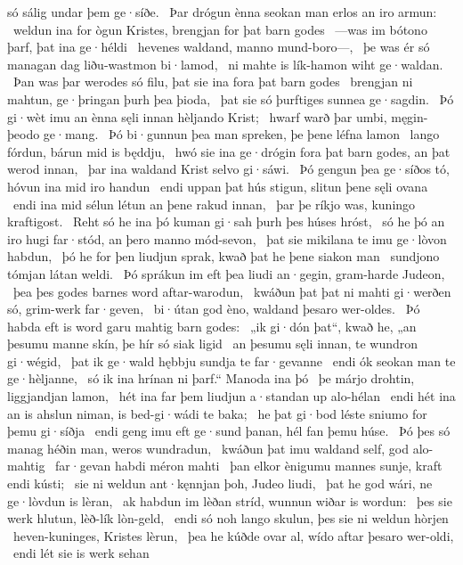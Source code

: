só sálig undar þem ge·síðe. \hld\ Þar drógun ènna seokan man
erlos an iro armun: \hld\ weldun ina for ògun Kristes,
brengjan for þat barn godes \hld\ —was im bótono þarf,
þat ina ge·héldi \hld\ hevenes waldand,
manno mund-boro—, \hld\ þe was ér só managan dag
liðu-wastmon bi·lamod, \hld\ ni mahte is lík-hamon
wiht ge·waldan. \hld\ Þan was þar werodes só filu,
þat sie ina fora þat barn godes \hld\ brengjan ni mahtun,
ge·þringan þurh þea þioda, \hld\ þat sie só þurftiges
sunnea ge·sagdin. \hld\ Þó gi·wèt imu an ènna sęli innan
hèljando Krist; \hld\ hwarf warð þar umbi,
męgin-þeodo ge·mang. \hld\ Þó bi·gunnun þea man spreken,
þe þene léfna lamon \hld\ lango fórdun,
bárun mid is będdju, \hld\ hwó sie ina ge·drógin fora þat barn godes,
an þat werod innan, \hld\ þar ina waldand Krist
selvo gi·sáwi. \hld\ Þó gengun þea ge·síðos tó,
hóvun ina mid iro handun \hld\ endi uppan þat hús stigun,
slitun þene sęli ovana \hld\ endi ina mid sélun létun
an þene rakud innan, \hld\ þar þe ríkjo was,
kuningo kraftigost. \hld\ Reht só he ina þó kuman gi·sah
þurh þes húses hróst, \hld\ só he þó an iro hugi far·stód,
an þero manno mód-sevon, \hld\ þat sie mikilana te imu
ge·lòvon habdun, \hld\ þó he for þen liudjun sprak,
kwað þat he þene siakon man \hld\ sundjono tómjan
látan weldi. \hld\ Þó sprákun im eft þea liudi an·gegin,
gram-harde Judeon, \hld\ þea þes godes barnes
word aftar-warodun, \hld\ kwáðun þat þat ni mahti gi·werðen só,
grim-werk far·geven, \hld\ bi·útan god èno,
waldand þesaro wer-oldes. \hld\ Þó habda eft is word garu
mahtig barn godes: \hld\ „ik gi·dón þat“, kwað he, „an þesumu manne skín,
þe hír só siak ligid \hld\ an þesumu sęli innan,
te wundron gi·wégid, \hld\ þat ik ge·wald hębbju
sundja te far·gevanne \hld\ endi ók seokan man
te ge·hèljanne, \hld\ só ik ina hrínan ni þarf.“
Manoda ina þó \hld\ þe márjo drohtin,
liggjandjan lamon, \hld\ hét ina far þem liudjun a·standan
up alo-hélan \hld\ endi hét ina an is ahslun niman,
is bed-gi·wádi te baka; \hld\ he þat gi·bod léste
sniumo for þemu gi·síðja \hld\ endi geng imu eft ge·sund þanan,
hél fan þemu húse. \hld\ Þó þes só manag héðin man,
weros wundradun, \hld\ kwáðun þat imu waldand self,
god alo-mahtig \hld\ far·gevan habdi
méron mahti \hld\ þan elkor ènigumu mannes sunje,
kraft endi kústi; \hld\ sie ni weldun ant·kęnnjan þoh,
Judeo liudi, \hld\ þat he god wári,
ne ge·lòvdun is lèran, \hld\ ak habdun im lèðan stríd,
wunnun wiðar is wordun: \hld\ þes sie werk hlutun,
lèð-lík lòn-geld, \hld\ endi só noh lango skulun,
þes sie ni weldun hòrjen \hld\ heven-kuninges,
Kristes lèrun, \hld\ þea he kúðde ovar al,
wído aftar þesaro wer-oldi, \hld\ endi lét sie is werk sehan
